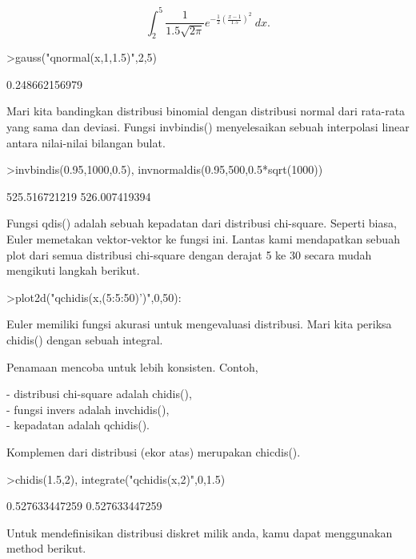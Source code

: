 \documentclass[a4paper,10pt]{article}
\begin{document}
\begin{eulernotebook}
\begin{eulercomment}
\end{eulercomment}
\begin{eulerformula}
\[
\int_2^5 \frac{1}{1.5\sqrt{2\pi}}e^{-\frac{1}{2}(\frac{x-1}{1.5})^2}\ dx.
\]
\end{eulerformula}
\begin{eulerprompt}
>gauss("qnormal(x,1,1.5)",2,5)
\end{eulerprompt}
\begin{euleroutput}
  0.248662156979
\end{euleroutput}
\begin{eulercomment}
Mari kita bandingkan distribusi binomial dengan distribusi normal dari rata-rata yang sama
dan deviasi. Fungsi invbindis() menyelesaikan sebuah interpolasi linear antara nilai-nilai
bilangan bulat.
\end{eulercomment}
\begin{eulerprompt}
>invbindis(0.95,1000,0.5), invnormaldis(0.95,500,0.5*sqrt(1000))
\end{eulerprompt}
\begin{euleroutput}
  525.516721219
  526.007419394
\end{euleroutput}
\begin{eulercomment}
Fungsi qdis() adalah sebuah kepadatan dari distribusi chi-square. Seperti biasa, Euler
memetakan vektor-vektor ke fungsi ini. Lantas kami mendapatkan sebuah plot dari semua
distribusi chi-square dengan derajat 5 ke 30 secara mudah mengikuti langkah berikut.
\end{eulercomment}
\begin{eulerprompt}
>plot2d("qchidis(x,(5:5:50)')",0,50):
\end{eulerprompt}
\begin{eulercomment}
Euler memiliki fungsi akurasi untuk mengevaluasi distribusi. Mari kita periksa chidis()
dengan sebuah integral.

Penamaan mencoba untuk lebih konsisten. Contoh,

- distribusi chi-square adalah chidis(),\\
- fungsi invers adalah invchidis(),\\
- kepadatan adalah qchidis().

Komplemen dari distribusi (ekor atas) merupakan chicdis().
\end{eulercomment}
\begin{eulerprompt}
>chidis(1.5,2), integrate("qchidis(x,2)",0,1.5)
\end{eulerprompt}
\begin{euleroutput}
  0.527633447259
  0.527633447259
\end{euleroutput}
\begin{eulercomment}
Untuk mendefinisikan distribusi diskret milik anda, kamu dapat menggunakan method berikut.


\end{eulercomment}
\end{eulernotebook}
\end{document}
